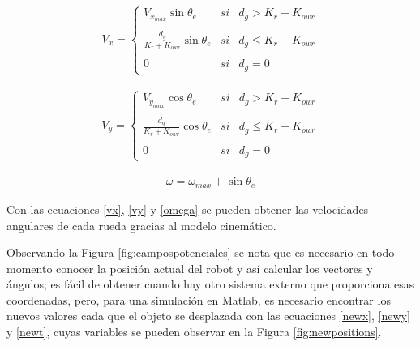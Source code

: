 \documentclass[conference]{IEEEtran}
\begin{document}
\begin{gather}\label{vy}
  V_{x}= \left\{ \begin{array}{lcc}
    V_{x_{max}} \sin \theta_{e} & si & d_{g} > K_{r}+K_{owr} \\
    \\ \frac{d_{g}}{K_{r}+K_{owr}} \sin \theta_{e} &  si & d_{g} \leq  K_{r}+K_{owr} \\
    \\ 0 &  si  & d_{g} = 0
  \end{array}
  \right.
\end{gather}

\begin{gather}\label{vx}
  V_{y}= \left\{ \begin{array}{lcc}
    V_{y_{max}} \cos \theta_{e} & si & d_{g} > K_{r}+K_{owr} \\
    \\ \frac{d_{g}}{K_{r}+K_{owr}} \cos \theta_{e} &  si & d_{g} \leq  K_{r}+K_{owr} \\
    \\ 0 &  si  & d_{g} = 0
  \end{array}
  \right.
\end{gather}

\begin{gather}\label{omega}
  \omega = \omega_{max}+\sin \theta_{e}
\end{gather}

Con las ecuaciones \ref{vx}, \ref{vy} y \ref{omega} se pueden obtener las velocidades
angulares de cada rueda gracias al modelo cinemático.

Observando la Figura \ref{fig:campospotenciales} se nota que es necesario en todo
momento conocer la posición actual del robot y así calcular los vectores y ángulos;
es fácil de obtener cuando hay otro sistema externo que proporciona esas coordenadas, pero,
para una simulación en Matlab, es necesario encontrar los nuevos valores cada que el objeto
se desplazada con las ecuaciones \ref{newx}, \ref{newy} y \ref{newt}, cuyas variables
se pueden observar en la Figura \ref{fig:newpositions}.
\end{document}
